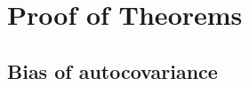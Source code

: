 \documentclass[11pt]{article}
\theoremstyle{remark}
\begin{document}


\section{Proof of Theorems} \label{appendix:A}

\subsection{Bias of autocovariance} \label{appendix:bias}
\end{document}
